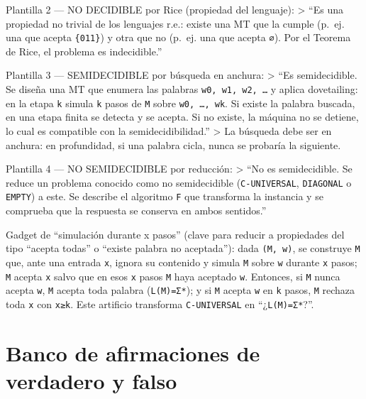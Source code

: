 \documentclass[12pt]{book} %
\begin{document}
Plantilla 2 --- NO DECIDIBLE por Rice (propiedad del lenguaje):
\textgreater{} ``Es una propiedad no trivial de los lenguajes r.e.:
existe una MT que la cumple (p.~ej. una que acepta \texttt{\{011\}}) y
otra que no (p.~ej. una que acepta \texttt{∅}). Por el Teorema de Rice,
el problema es indecidible.''

Plantilla 3 --- SEMIDECIDIBLE por búsqueda en anchura: \textgreater{}
``Es semidecidible. Se diseña una MT que enumera las palabras
\texttt{w0,\ w1,\ w2,\ …} y aplica dovetailing: en la etapa \texttt{k}
simula \texttt{k} pasos de \texttt{M} sobre \texttt{w0,\ …,\ wk}. Si
existe la palabra buscada, en una etapa finita se detecta y se acepta.
Si no existe, la máquina no se detiene, lo cual es compatible con la
semidecidibilidad.'' \textgreater{} La búsqueda debe ser en anchura: en
profundidad, si una palabra cicla, nunca se probaría la siguiente.

Plantilla 4 --- NO SEMIDECIDIBLE por reducción: \textgreater{} ``No es
semidecidible. Se reduce un problema conocido como no semidecidible
(\texttt{C-UNIVERSAL}, \texttt{DIAGONAL} o \texttt{EMPTY}) a este. Se
describe el algoritmo \texttt{F} que transforma la instancia y se
comprueba que la respuesta se conserva en ambos sentidos.''

Gadget de ``simulación durante \textbar x\textbar{} pasos'' (clave para
reducir a propiedades del tipo ``acepta todas'' o ``existe palabra no
aceptada''): dada \texttt{(M,\ w)}, se construye
\texttt{M\textquotesingle{}} que, ante una entrada \texttt{x}, ignora su
contenido y simula \texttt{M} sobre \texttt{w} durante
\texttt{\textbar{}x\textbar{}} pasos; \texttt{M\textquotesingle{}}
acepta \texttt{x} salvo que en esos \texttt{\textbar{}x\textbar{}} pasos
\texttt{M} haya aceptado \texttt{w}. Entonces, si \texttt{M} nunca
acepta \texttt{w}, \texttt{M\textquotesingle{}} acepta toda palabra
(\texttt{L(M\textquotesingle{})=Σ*}); y si \texttt{M} acepta \texttt{w}
en \texttt{k} pasos, \texttt{M\textquotesingle{}} rechaza toda
\texttt{x} con \texttt{\textbar{}x\textbar{}≥k}. Este artificio
transforma \texttt{C-UNIVERSAL} en
``¿\texttt{L(M\textquotesingle{})=Σ*}?''.

\hypertarget{banco-de-afirmaciones-de-verdadero-y-falso}{%
\section{Banco de afirmaciones de verdadero y
falso}\label{banco-de-afirmaciones-de-verdadero-y-falso}}
\end{document}
